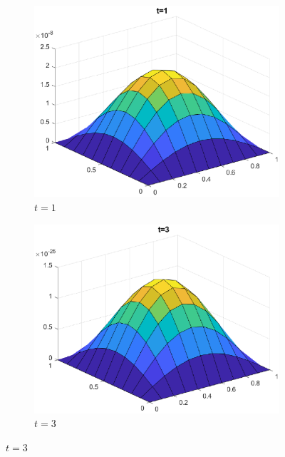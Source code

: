 \documentclass[]{article}
\begin{document}
	\begin{figure}[htbp]
		\centering	
		\begin{subfigure}[b]{0.45\textwidth}
			\includegraphics[width=\textwidth]{images/h3_t1.eps}
			\caption{$t = 1$}
			\label{fig:image4}
		\end{subfigure}
		\hfill
		\begin{subfigure}[b]{0.45\textwidth}
			\includegraphics[width=\textwidth]{images/h3_t2.eps}
			\caption{$t = 3$}
			\label{fig:image5}
		\end{subfigure}
	\end{figure}
\end{document}

